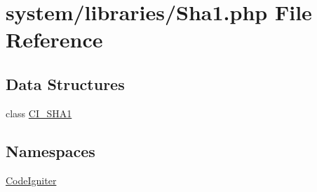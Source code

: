 \hypertarget{_sha1_8php}{\section{system/libraries/\-Sha1.php File Reference}
\label{_sha1_8php}
}
\subsection*{Data Structures}
\begin{DoxyCompactItemize}
\item 
class \hyperlink{class_c_i___s_h_a1}{C\-I\-\_\-\-S\-H\-A1}
\end{DoxyCompactItemize}
\subsection*{Namespaces}
\begin{DoxyCompactItemize}
\item 
\hyperlink{namespace_code_igniter}{Code\-Igniter}
\end{DoxyCompactItemize}
